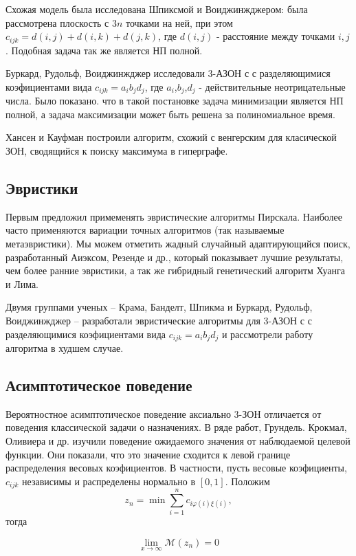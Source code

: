\documentclass[14pt,a4paper]{article}
\begin{document}
Схожая модель была исследована Шпиксмой и
Воиджинжджером:
была рассмотрена плоскость с $3n$ точками на ней,
при этом $c_{ijk} = d(i,j) + d(i,k) + d(j,k)$, где
$d(i,j)$ - расстояние между точками $i,j$. Подобная
задача так же является НП полной.

Буркард, Рудольф, Воиджинжджер исследовали 3-АЗОН с
с разделяющимися коэфициентами вида $c_{ijk} = a_i b_j
d_j$,
где $a_i$,$ b_j $,$d_j$ - действительные неотрицательные
числа. Было показано. что в такой постановке задача
минимизации является НП полной, а задача максимизации
может быть решена за полиномиальное время.

Хансен и Кауфман построили алгоритм, схожий с венгерским
для класической ЗОН, сводящийся к поиску максимума в
гиперграфе.

\subsection{Эвристики}

Первым предложил примеменять эвристические алгоритмы
Пирскала. Наиболее часто применяются вариации точных
алгоритмов (так называемые метаэвристики). Мы можем
отметить жадный случайный адаптирующийся поиск,
разработанный
Аиэксом, Резенде и др., который показывает лучшие
результаты,
чем более ранние эвристики, а так же гибридный
генетический
алгоритм Хуанга и Лима.

Двумя группами ученых -- Крама, Банделт, Шпикма
и Буркард, Рудольф, Воиджинжджер -- разработали
эвристические
алгоритмы для 3-АЗОН с
с разделяющимися коэфициентами вида $c_{ijk} = a_i b_j
d_j$
и рассмотрели работу алгоритма в худшем случае.

\subsection{Асимптотическое поведение}

Вероятностное асимптотическое поведение аксиально 3-ЗОН
отличается от поведения классической задачи о назначениях.
В ряде работ, Грундель. Крокмал, Оливиера и др. изучили
поведение ожидаемого значения от наблюдаемой целевой функции.
Они показали, что это значение сходится к левой границе распределения 
весовых коэфициентов. В частности, пусть весовые коэфициенты, $c_{ijk}$ 
независимы и распределены нормально в $ \left[ 0 , 1 \right] $. 
Положим 
$$
 	z_{n} = \min \sum^n_{i=1} c_{i \varphi (i) \xi (i)}, 
$$
тогда 

$$
	\lim_{x\to\infty} \mathcal{M} (z_n) = 0
$$
\end{document}
